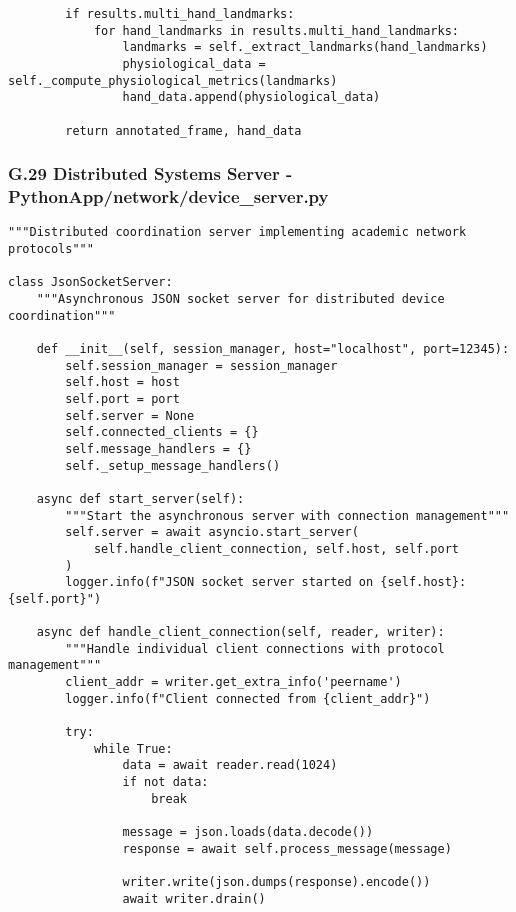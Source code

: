 \documentclass[12pt,a4paper]{article}
\begin{document}
{{\begin{verbatim}
        if results.multi_hand_landmarks:
            for hand_landmarks in results.multi_hand_landmarks:
                landmarks = self._extract_landmarks(hand_landmarks)
                physiological_data = self._compute_physiological_metrics(landmarks)
                hand_data.append(physiological_data)
                
        return annotated_frame, hand_data
\end{verbatim}

\subsubsection{G.29 Distributed Systems Server - PythonApp/network/device_server.py}

\begin{verbatim}
"""Distributed coordination server implementing academic network protocols"""

class JsonSocketServer:
    """Asynchronous JSON socket server for distributed device coordination"""
    
    def __init__(self, session_manager, host="localhost", port=12345):
        self.session_manager = session_manager
        self.host = host
        self.port = port
        self.server = None
        self.connected_clients = {}
        self.message_handlers = {}
        self._setup_message_handlers()
    
    async def start_server(self):
        """Start the asynchronous server with connection management"""
        self.server = await asyncio.start_server(
            self.handle_client_connection, self.host, self.port
        )
        logger.info(f"JSON socket server started on {self.host}:{self.port}")
    
    async def handle_client_connection(self, reader, writer):
        """Handle individual client connections with protocol management"""
        client_addr = writer.get_extra_info('peername')
        logger.info(f"Client connected from {client_addr}")
        
        try:
            while True:
                data = await reader.read(1024)
                if not data:
                    break
                    
                message = json.loads(data.decode())
                response = await self.process_message(message)
                
                writer.write(json.dumps(response).encode())
                await writer.drain()
                

\end{verbatim}}}
\end{document}
